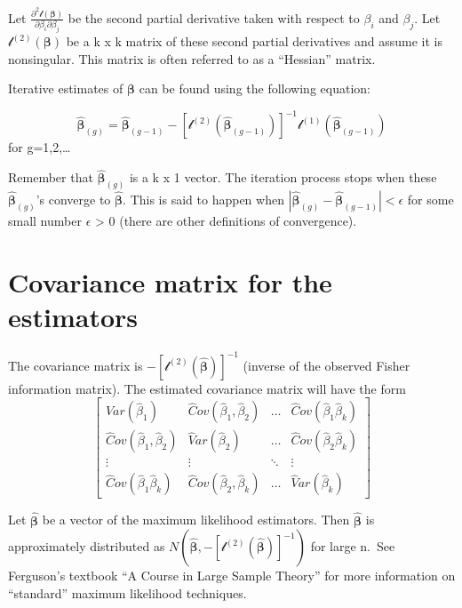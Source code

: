 \documentclass[
]{book}
\theoremstyle{definition}
\theoremstyle{definition}
\theoremstyle{definition}
\theoremstyle{definition}
\theoremstyle{remark}
\begin{document}
Let \(\frac{\partial^2 \mathcal l (\boldsymbol \beta)}{\partial \beta_i \partial \beta_j}\) be the second partial derivative taken with respect to \(\beta_i\) and \(\beta_j\). Let \(\mathcal l^{(2)}(\boldsymbol \beta)\) be a k x k matrix of these second partial derivatives and assume it is nonsingular. This matrix is often referred to as a ``Hessian'' matrix.

Iterative estimates of \(\boldsymbol \beta\) can be found using the following equation:

\[\boldsymbol{\hat{\beta}}_{(g)}=\boldsymbol{\hat{\beta}}_{(g-1)}-[\mathcal l^{(2)}(\boldsymbol{\hat{\beta}}_{(g-1)})]^{-1}\mathcal l^{(1)}(\boldsymbol{\hat{\beta}}_{(g-1)})\] for g=1,2,\ldots{}

Remember that \(\boldsymbol{\hat{\beta}}_{(g)}\) is a k x 1 vector. The iteration process stops when these \(\boldsymbol{\hat{\beta}}_{(g)}\)'s converge to \(\boldsymbol{\hat{\beta}}\). This is said to happen when \(|\boldsymbol{\hat{\beta}}_{(g)}-\boldsymbol{\hat{\beta}}_{(g-1)}|< \epsilon\) for some small number \(\epsilon\) \textgreater{} 0 (there are other definitions of convergence).

\hypertarget{covariance-matrix-for-the-estimators}{%
\section{Covariance matrix for the estimators}\label{covariance-matrix-for-the-estimators}}

The covariance matrix is \(-[\mathcal l^{(2)}(\boldsymbol{\hat{\beta}})]^{-1}\) (inverse of the observed Fisher information matrix). The estimated covariance matrix will have the form \[\begin{bmatrix} \hat Var(\hat\beta_1) & \hat Cov(\hat\beta_1,\hat\beta_2) &\dots & \hat Cov(\hat\beta_1\hat\beta_k) \\
\hat Cov(\hat\beta_1,\hat\beta_2) & \hat Var(\hat\beta_2)  &\dots & \hat Cov(\hat\beta_2\hat\beta_k)\\
\vdots & \vdots & \ddots & \vdots\\
\hat Cov(\hat\beta_1\hat\beta_k) & \hat Cov(\hat\beta_2,\hat\beta_k) &\dots & \hat Var(\hat\beta_k) \end{bmatrix}\]

Let \(\hat{\boldsymbol{\beta}}\) be a vector of the maximum likelihood estimators. Then \(\hat{\boldsymbol{\beta}}\) is approximately distributed as \(N(\hat{\boldsymbol{\beta}}, -[\mathcal l^{(2)}(\boldsymbol{\hat{\beta}})]^{-1})\) for large n.~See Ferguson's textbook ``A Course in Large Sample Theory'' for more information on ``standard'' maximum likelihood techniques.
\end{document}
